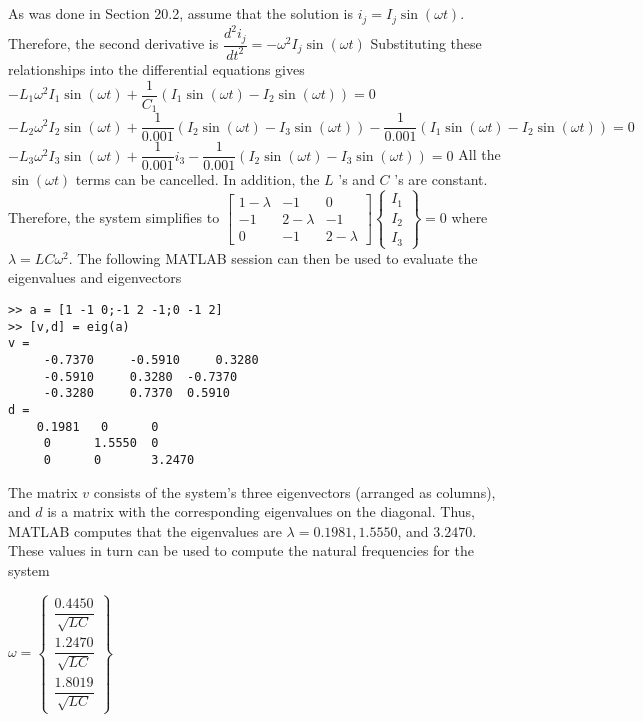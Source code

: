 \documentclass[../main.tex]{subfiles}
\begin{document}
\section{}
As was done in Section 20.2, assume that the solution is $i_{j}=I_{j} \sin (\omega t)$. Therefore, the second derivative is
	\bigbreak
$\dfrac{d^{2} i_{j}}{d t^{2}}=-\omega^{2} I_{j} \sin (\omega t)$
	\bigbreak
Substituting these relationships into the differential equations gives
	\bigbreak
$-L_{1} \omega^{2} I_{1} \sin (\omega t)+\dfrac{1}{C_{1}}\left(I_{1} \sin (\omega t)-I_{2} \sin (\omega t)\right)=0$
	\bigbreak
$-L_{2} \omega^{2} I_{2} \sin (\omega t)+\dfrac{1}{0.001}\left(I_{2} \sin (\omega t)-I_{3} \sin (\omega t)\right)-\dfrac{1}{0.001}\left(I_{1} \sin (\omega t)-I_{2} \sin (\omega t)\right)=0$
	\bigbreak
$-L_{3} \omega^{2} I_{3} \sin (\omega t)+\dfrac{1}{0.001} i_{3}-\dfrac{1}{0.001}\left(I_{2} \sin (\omega t)-I_{3} \sin (\omega t)\right)=0$
	\bigbreak
All the $\sin (\omega t)$ terms can be cancelled. In addition, the $L$ 's and $C$ 's are constant. Therefore, the system simplifies to
	\bigbreak
$
\left[\begin{array}{ccc}
1-\lambda & -1 & 0 \\
-1 & 2-\lambda & -1 \\
0 & -1 & 2-\lambda
\end{array}\right]\left\{\begin{array}{l}
I_{1} \\
I_{2} \\
I_{3}
\end{array}\right\}=0
$
	\bigbreak
where $\lambda=L C \omega^{2}$. The following MATLAB session can then be used to evaluate the eigenvalues and eigenvectors
	\bigbreak
\begin{lstlisting}[numbers=none]
>> a = [1 -1 0;-1 2 -1;0 -1 2]
>> [v,d] = eig(a)
v =
	 -0.7370	 -0.5910	 0.3280
	 -0.5910	 0.3280	 -0.7370
	 -0.3280	 0.7370	 0.5910
d =
 	0.1981	 0	 	0
	 0 		1.5550 	0
	 0 		0 		3.2470
\end{lstlisting}
	\bigbreak
\begin{blockquote}
The matrix $v$ consists of the system's three eigenvectors (arranged as columns), and $d$ is a matrix with the corresponding eigenvalues on the diagonal. Thus, MATLAB computes that the eigenvalues are $\lambda=0.1981,1.5550$, and $3.2470$. These values in turn can be used to compute the natural frequencies for the system
\end{blockquote}
	\bigbreak
$
\omega=\left\{\begin{array}{c}
\dfrac{0.4450}{\sqrt{L C}} \\
\dfrac{1.2470}{\sqrt{L C}} \\
\dfrac{1.8019}{\sqrt{L C}}
\end{array}\right\}
$
	\bigbreak
\end{document}
